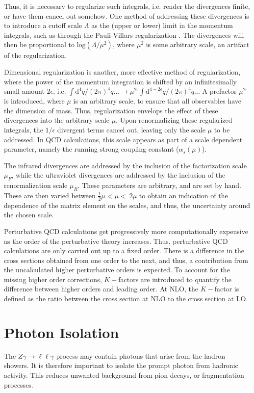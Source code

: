 \documentclass[11pt,a4paper,openright,twoside]{report}
\newcommand{\Zg}{$Z\gamma\to \ell\ell\gamma$ }
\begin{document}
Thus, it is necessary to regularize such integrals, i.e. render the divergences finite, or have them cancel out somehow. One method of addressing these divergences is to introduce a cutoff scale $\Lambda$ as the (upper or lower) limit in the momentum integrals, such as through the Pauli-Villars regularization \cite{Pauli-Villars}. The divergences will then be proportional to log$(\Lambda/\mu^2)$, where $\mu^2$ is some arbitrary scale, an artifact of the regularization.

Dimensional regularization is another, more effective method of regularization, where the power of the momentum integration is shifted by an infinitesimally small amount $2\epsilon$, i.e. $\int \mathrm{d}^4q/(2\pi)^4 q... \to \mu^{2\epsilon}\int \mathrm{d}^{4-2\epsilon}q/(2\pi)^4 q...$ A prefactor $\mu^{2\epsilon}$ is introduced, where $\mu$ is an arbitrary scale, to ensure that all observables have the dimension of mass. Thus, regularization envelops the effect of these divergences into the arbitrary scale $\mu$. Upon renormalizing these regularized integrals, the $1/\epsilon$ divergent terms cancel out, leaving only the scale $\mu$ to be addressed. In QCD calculations, this scale appears as part of a scale dependent parameter, namely the running strong coupling constant ($\alpha_s(\mu)$).

The infrared divergences are addressed by the inclusion of the factorization scale $\mu_F$, while the ultraviolet divergences are addressed by the inclusion of the renormalization scale $\mu_R$. These parameters are arbitrary, and are set by hand. These are then varied between $\frac{1}{2}\mu < \mu < \ 2\mu$ to obtain an indication of the dependence of the matrix element on the scales, and thus, the uncertainty around the chosen scale. 

Perturbative QCD calculations get progressively more computationally expensive as the order of the perturbative theory increases. Thus, perturbative QCD calculations are only carried out up to a fixed order. There is a difference in the cross sections obtained from one order to the next, and thus, a contribution from the uncalculated higher perturbative orders is expected. To account for the missing higher order corrections, $K-$factors are introduced to quantify the difference between higher orders and leading order. At NLO, the $K-$factor is defined as the ratio between the cross section at NLO to the cross section at LO.

\section{Photon Isolation}
The \Zg process may contain photons that arise from the hadron showers. It is therefore important to isolate the prompt photon from hadronic activity. This reduces unwanted background from pion decays, or fragmentation processes.
\end{document}
